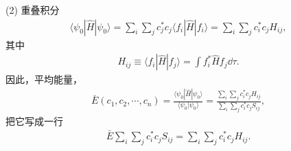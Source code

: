 
(2) 重叠积分
\begin{align}
    \langle \psi_0 | \hat H | \psi_0 \rangle = 
    \sum_i \sum_j c_j^* c_j \langle f_i | \hat H | f_i \rangle = \sum_i \sum_j c_i^* c_j H_{ij},
\end{align}
其中
\begin{align}
    H_{ij} \equiv \langle f_i | \hat H | f_j \rangle = \int f_i^* \hat H f_j \dd\tau. 
\end{align}
因此，平均能量，
\begin{align}
    \bar E(c_1, c_2, \cdots, c_n) = \frac{\langle \psi_0 | \hat H | \psi_0 \rangle}{\langle \psi_0 | \psi_0 \rangle} = \frac{\sum_i \sum_j c_i^* c_j H_{ij}}{\sum_i \sum_j c_i^* c_j S_{ij}},
\end{align}
把它写成一行
\begin{align}
    \bar E \sum_i \sum_j c_i^* c_j S_{ij} = \sum_i \sum_j c_i^* c_j H_{ij}. 
\end{align}

